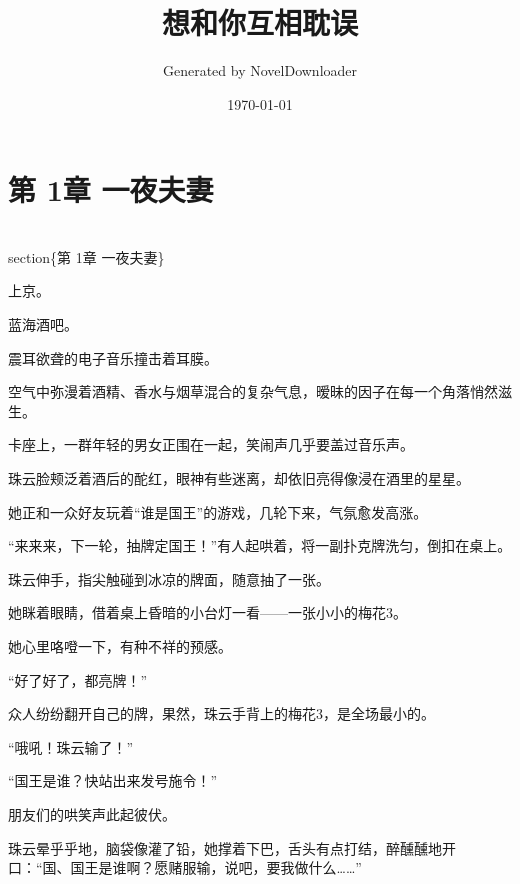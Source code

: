 \documentclass[12pt,a4paper]{article}
\title{想和你互相耽误}
\author{Generated by NovelDownloader}
\date{\today}
\begin{document}
\maketitle
\tableofcontents
\newpage

\section{第 1章 一夜夫妻}


\\section\{第 1章 一夜夫妻\}

上京。



蓝海酒吧。



震耳欲聋的电子音乐撞击着耳膜。



空气中弥漫着酒精、香水与烟草混合的复杂气息，暧昧的因子在每一个角落悄然滋生。



卡座上，一群年轻的男女正围在一起，笑闹声几乎要盖过音乐声。



珠云脸颊泛着酒后的酡红，眼神有些迷离，却依旧亮得像浸在酒里的星星。



她正和一众好友玩着“谁是国王”的游戏，几轮下来，气氛愈发高涨。



“来来来，下一轮，抽牌定国王！”有人起哄着，将一副扑克牌洗匀，倒扣在桌上。



珠云伸手，指尖触碰到冰凉的牌面，随意抽了一张。



她眯着眼睛，借着桌上昏暗的小台灯一看——一张小小的梅花3。



她心里咯噔一下，有种不祥的预感。



“好了好了，都亮牌！”



众人纷纷翻开自己的牌，果然，珠云手背上的梅花3，是全场最小的。



“哦吼！珠云输了！”



“国王是谁？快站出来发号施令！”



朋友们的哄笑声此起彼伏。



珠云晕乎乎地，脑袋像灌了铅，她撑着下巴，舌头有点打结，醉醺醺地开口：“国、国王是谁啊？愿赌服输，说吧，要我做什么……”
\end{document}
